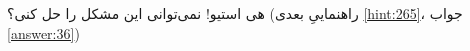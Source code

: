 \section{}
\paragraph{}\label{hint:361}
هی استیو! نمی‌توانی این مشکل را حل کنی؟  (راهنماییِ بعدی \ref{hint:265}، جواب \ref{answer:36})